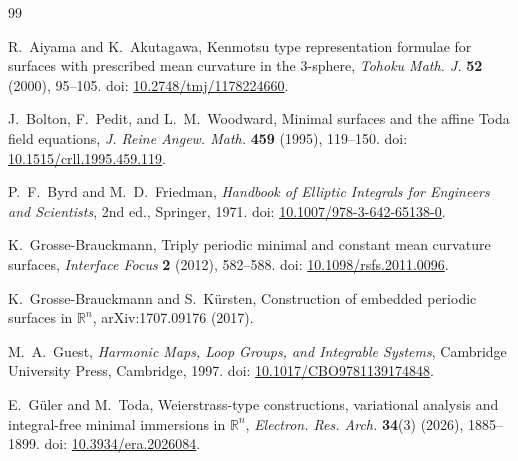 \documentclass[12pt]{article}
\numberwithin{equation}{section}
\theoremstyle{definition}
\theoremstyle{remark}
\begin{document}
\begin{thebibliography}{99}

R.~Aiyama and K.~Akutagawa,
Kenmotsu type representation formulae for surfaces with prescribed mean curvature in the 
$3$-sphere,
\textit{Tohoku Math. J.} \textbf{52} (2000), 95--105.
doi: \href{https://doi.org/10.2748/tmj/1178224660}{10.2748/tmj/1178224660}.

J.~Bolton, F.~Pedit, and L.~M.~Woodward,
Minimal surfaces and the affine Toda field equations,
\textit{J. Reine Angew. Math.} \textbf{459} (1995), 119--150.
doi: \href{https://doi.org/10.1515/crll.1995.459.119}{10.1515/crll.1995.459.119}.

P.~F.~Byrd and M.~D.~Friedman,
\textit{Handbook of Elliptic Integrals for Engineers and Scientists},
2nd ed., Springer, 1971.
doi: \href{https://doi.org/10.1007/978-3-642-65138-0}{10.1007/978-3-642-65138-0}.

K.~Grosse-Brauckmann,
Triply periodic minimal and constant mean curvature surfaces,
\textit{Interface Focus} \textbf{2} (2012), 582--588.
doi: \href{https://doi.org/10.1098/rsfs.2011.0096}{10.1098/rsfs.2011.0096}.

K.~Grosse-Brauckmann and S.~Kürsten,
Construction of embedded periodic surfaces in $\mathbb{R}^n$,
arXiv:1707.09176 (2017).

M.~A.~Guest,
\textit{Harmonic Maps, Loop Groups, and Integrable Systems},
Cambridge University Press, Cambridge, 1997.
doi: \href{https://doi.org/10.1017/CBO9781139174848}{10.1017/CBO9781139174848}.

E.~G\"uler and M.~Toda,
Weierstrass-type constructions, variational analysis and integral-free minimal immersions in $\mathbb{R}^n$,
\textit{Electron. Res. Arch.} \textbf{34}(3) (2026), 1885--1899.
doi: \href{https://doi.org/10.3934/era.2026084}{10.3934/era.2026084}.


\end{thebibliography}
\end{document}

